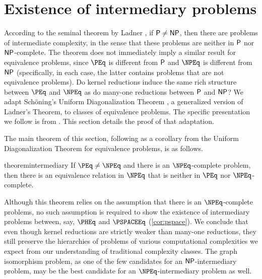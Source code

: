 \section{Existence of intermediary problems}
\label{sec:intermediary}
%
According to the seminal theorem by Ladner \autocite{ladner}, if $\P \neq \NP$, then there are problems of intermediate complexity, in the sense that these problems are neither in $\P$ nor $\NP$-complete.
The theorem does not immediately imply a similar result for equivalence problems, since $\PEq$ is different from $\P$ and $\NPEq$ is different from $\NP$ (specifically, in each case, the latter contains problems that are not equivalence problems).
Do kernel reductions induce the same rich structure between $\PEq$ and $\NPEq$ as do many-one reductions between $\P$ and $\NP$?
We adapt Schöning's Uniform Diagonalization Theorem \autocite{schoning82}, a generalized version of Ladner's Theorem, to classes of equivalence problems.
The specific presentation we follow is from \autocite{bdg95}.
This section details the proof of that adaptation.

%
The main theorem of this section, following as a corollary from the Uniform Diagonalization Theorem for equivalence problems, is as follows.
\begin{restatable*}{theorem}{intermediary}\label{thm:intermediary}
  If $\PEq \neq \NPEq$ and there is an $\NPEq$-complete problem, then there is an equivalence relation in $\NPEq$ that is neither in $\PEq$ nor $\NPEq$-complete.
\end{restatable*}
Although this theorem relies on the assumption that there is an $\NPEq$-complete problems, no such assumption is required to show the existence of intermediary problems between, say, $\PHEq$ and $\PSPACEEq$ (\autoref{cor:pspace}).
We conclude that even though kernel reductions are strictly weaker than many-one reductions, they still preserve the hierarchies of problems of various computational complexities we expect from our understanding of traditional complexity classes.
The graph isomorphism problem, as one of the few candidates for an $\NP$-intermediary problem, may be the best candidate for an $\NPEq$-intermediary problem as well.


